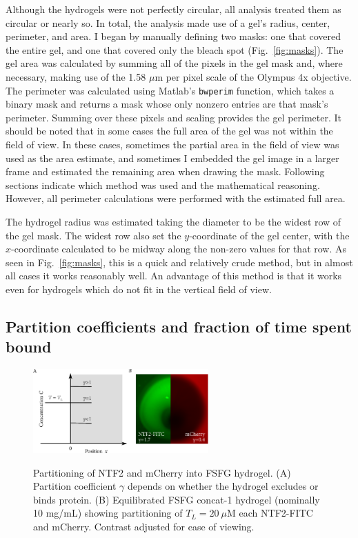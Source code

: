 Although the hydrogels were not perfectly circular, all analysis treated them as circular or nearly so.  In total, the analysis made use of a gel's radius, center, perimeter, and area.  I began by manually defining two masks: one that covered the entire gel, and one that covered only the bleach spot (Fig.~\ref{fig:masks}).  The gel area was calculated by summing all of the pixels in the gel mask and, where necessary, making use of the 1.58 $\mu$m per pixel scale of the Olympus 4x objective.  The perimeter was calculated using Matlab's \texttt{bwperim} function, which takes a binary mask and returns a mask whose only nonzero entries are that mask's perimeter.  Summing over these pixels and scaling provides the gel perimeter.  It should be noted that in some cases the full area of the gel was not within the field of view.  In these cases, sometimes the partial area in the field of view was used as the area estimate, and sometimes I embedded the gel image in a larger frame and estimated the remaining area when drawing the mask.  Following sections indicate which method was used and the mathematical reasoning.  However, all perimeter calculations were performed with the estimated full area.

The hydrogel radius was estimated taking the diameter to be the widest row of the gel mask.  The widest row also set the $y$-coordinate of the gel center, with the $x$-coordinate calculated to be midway along the non-zero values for that row.  As seen in Fig.~\ref{fig:masks}, this is a quick and relatively crude method, but in almost all cases it works reasonably well.  An advantage of this method is that it works even for hydrogels which do not fit in the vertical field of view.

\subsection{Partition coefficients and fraction of time spent bound}
\label{sec:part-coeff}

\begin{figure} 
\caption{Partitioning of NTF2 and mCherry into FSFG hydrogel.  (A) Partition coefficient $\gamma$ depends on whether the hydrogel excludes or binds protein. (B) Equilibrated FSFG concat-1 hydrogel (nominally 10 mg/mL) showing partitioning of $T_L = 20\ \mu$M each NTF2-FITC and mCherry.  Contrast adjusted for ease of viewing.\\}
\centering
\includegraphics[width=0.6\textwidth]{figs/ch04/partition.pdf}
\label{fig:partition}
\end{figure}

